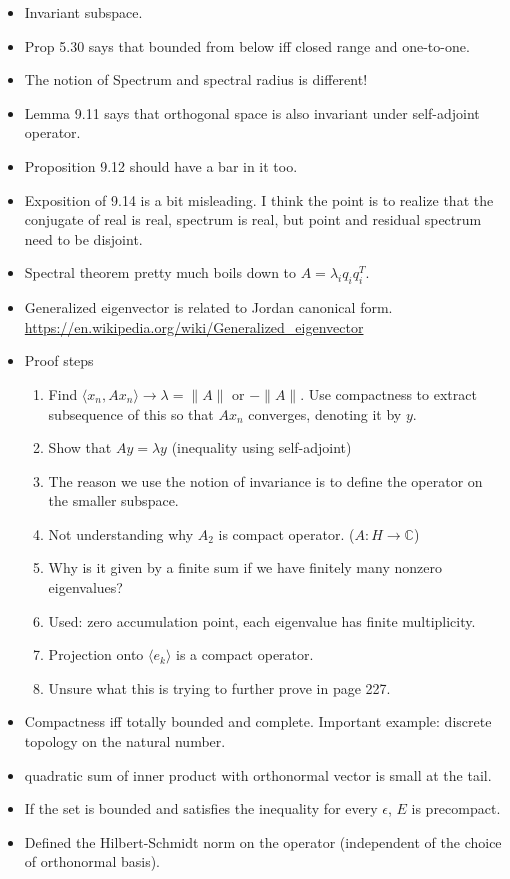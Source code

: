 \documentclass{article}
\theoremstyle{remark}
\begin{document}
\begin{itemize}
\item Invariant subspace.
\item Prop 5.30 says that bounded from below iff closed range and one-to-one.
\item The notion of Spectrum and spectral radius is different!
\item Lemma 9.11 says that orthogonal space is also invariant under self-adjoint operator.
\item Proposition 9.12 should have a bar in it too.
\item Exposition of 9.14 is a bit misleading. I think the point is to realize that the conjugate of real is real, spectrum is real, but point and residual spectrum need to be disjoint.


\item Spectral theorem pretty much boils down to $A=\lambda_i q_iq_i^T$.
\item Generalized eigenvector is related to Jordan canonical form. \url{https://en.wikipedia.org/wiki/Generalized_eigenvector}
\item Proof steps
\begin{enumerate}
    \item Find $\langle x_n,Ax_n\rangle\to\lambda=\lVert A\rVert$ or $-\lVert A\rVert$. Use compactness to extract subsequence of this so that $Ax_n$ converges, denoting it by $y$.
    \item Show that $Ay=\lambda y$ (inequality using self-adjoint)
    \item The reason we use the notion of invariance is to define the operator on the smaller subspace.
    \item Not understanding why $A_2$ is compact operator. ($A:H\to\mathbb{C}$)
    \item Why is it given by a finite sum if we have finitely many nonzero eigenvalues?
    \item Used: zero accumulation point, each eigenvalue has finite multiplicity.
    \item Projection onto $\langle e_k\rangle$ is a compact operator.
    \item Unsure what this is trying to further prove in page 227.
\end{enumerate}
\item Compactness iff totally bounded and complete. Important example: discrete topology on the natural number.
\item quadratic sum of inner product with orthonormal vector is small at the tail.
\item If the set is bounded and satisfies the inequality for every $\epsilon$, $E$ is precompact.
\item Defined the Hilbert-Schmidt norm on the operator (independent of the choice of orthonormal basis).


\end{itemize}
\end{document}
